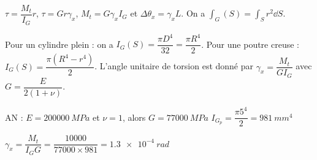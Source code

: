 \begin{corrigebox}
$\tau = \dfrac{M_t}{I_G}r$, $\tau = G r \gamma_x$, $M_t= G \gamma_x I_G$ et $\Delta \theta_x = \gamma_x L$.
On a $\int_G(S)=\int_S r^2 \dd S$.

Pour un cylindre plein : on a $I_G(S)=\dfrac{\pi D^4}{32} = \dfrac{\pi R^4}{2}$.
Pour une poutre creuse : $I_G(S) = \dfrac{\pi \left(R^4 -r^4\right) }{2} $.
L'angle unitaire de torsion est donné par $\gamma_x = \dfrac{M_t }{GI_G}$ avec $G=\dfrac{E}{2(1+\nu)}$.

AN : 
$E = \SI{200 000}{MPa}$ et $\nu = 1$, alors $G = \SI{77 000}{MPa}$
$I_{G_p} = \dfrac{\pi 5^4}{2} = \SI{981}{mm^4}$ 

$\gamma_x = \dfrac{M_t }{I_G G} = \dfrac{10 000}{77 000\times 981} = \SI{1,3e-4}{rad}$
\end{corrigebox}
